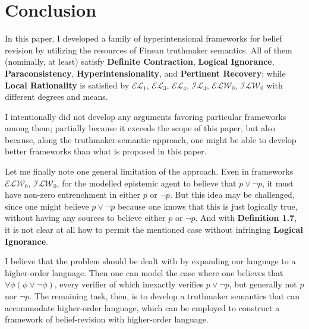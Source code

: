 \documentclass[12pt]{article}
\begin{document}
\section{Conclusion}
In this paper, I developed a family of hyperintensional frameworks for belief revision by utilizing the resources of Finean truthmaker semantics. All of them (nominally, at least) satisfy \textbf{Definite Contraction}, \textbf{Logical Ignorance}, \textbf{Paraconsistency}, \textbf{Hyperintensionality}, and \textbf{Pertinent Recovery}; while \textbf{Local Rationality} is satisfied by $\mathcal{EL}_1$, $\mathcal{EL}_3$, $\mathcal{EL}_4$, $\mathcal{IL}_4$, $\mathcal{ELW}_0$, $\mathcal{ILW}_0$ with different degrees and means. 
\par
I intentionally did not develop any arguments favoring particular frameworks among them; partially because it exceeds the scope of this paper, but also because, along the truthmaker-semantic approach, one might be able to develop better frameworks than what is proposed in this paper. 
\par
Let me finally note one general limitation of the approach. Even in frameworks $\mathcal{ELW}_0$, $\mathcal{ILW}_0$, for the modelled epistemic agent to believe that $p \lor \lnot p$, it must have non-zero entrenchment in either $p$ or $\lnot p$. But this idea may be challenged, since one might believe $p \lor \lnot p$ because one knows that this is just logically true, without having any sources to believe either $p$ or $\lnot p$. And with \textbf{Definition 1.7}, it is not clear at all how to permit the mentioned case without infringing \textbf{Logical Ignorance}. 
\par
I believe that the problem should be dealt with by expanding our language to a higher-order language. Then one can model the case where one believes that $\forall \phi (\phi \lor \lnot \phi)$, every verifier of which inexactly verifies $p \lor \lnot p$, but generally not $p$ nor $\lnot p$. The remaining task, then, is to develop a truthmaker semantics that can accommodate higher-order language, which can be employed to construct a framework of belief-revision with higher-order language.

\end{document}
